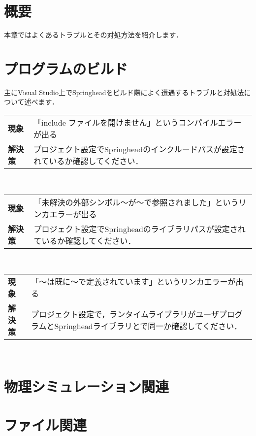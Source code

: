 \section{概要}

\KLUDGE 本章ではよくあるトラブルとその対処方法を紹介します．

\section{プログラムのビルド}

\KLUDGE 主にVisual Studio上でSpringheadをビルド際によく遭遇するトラブルと対処法について述べます．
\vspace{2mm}\\

\noindent
\begin{tabular}{p{10mm}p{110mm}}
\textbf{現象} & 「include ファイルを開けません」というコンパイルエラーが出る \\
\textbf{解決策} & プロジェクト設定でSpringheadのインクルードパスが設定されているか確認してください．
\end{tabular}
\vspace{2mm}\\
\begin{tabular}{p{10mm}p{110mm}}
\textbf{現象} & 「未解決の外部シンボル〜が〜で参照されました」というリンカエラーが出る \\
\textbf{解決策} & プロジェクト設定でSpringheadのライブラリパスが設定されているか確認してください．
\end{tabular}
\vspace{2mm}\\
\begin{tabular}{p{10mm}p{110mm}}
\textbf{現象} & 「〜は既に〜で定義されています」というリンカエラーが出る\\
\textbf{解決策} & プロジェクト設定で，ランタイムライブラリがユーザプログラムとSpringheadライブラリとで同一か確認してください．
\end{tabular}
\vspace{2mm}\\

\section{物理シミュレーション関連}


\section{ファイル関連}

